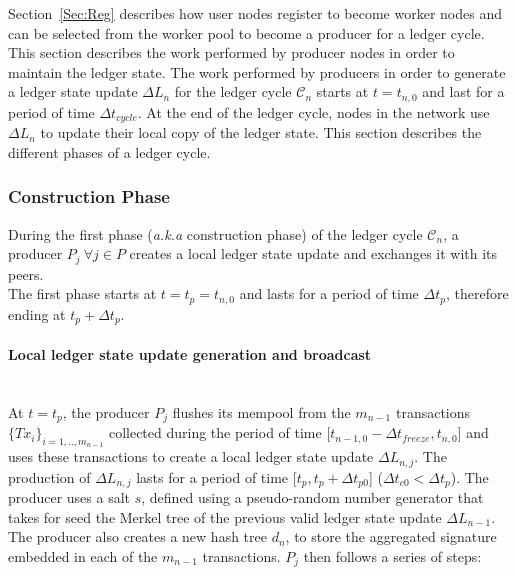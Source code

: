 Section~\ref{Sec:Reg} describes how user nodes register to become worker nodes and can be selected from the worker pool to become a producer for a ledger cycle. This section describes the work performed by producer nodes in order to maintain the ledger state. The work performed by producers in order to generate a ledger state update $\Delta L_n$ for the ledger cycle $\mathcal{C}_n$ starts at $t=t_{n,0}$ and last for a period of time $\Delta t_{cycle}$. At the end of the ledger cycle, nodes in the network use $\Delta L_n$ to update their local copy of the ledger state. This section describes the different phases of a ledger cycle. 


\subsubsection{Construction Phase}
\label{subsec:comp}

During the first phase (\textit{a.k.a} construction phase) of the ledger cycle $\mathcal{C}_n$, a producer $P_j~\forall j \in P$ creates a local ledger state update and exchanges it with its peers.\\

The first phase starts at $t = t_p = t_{n,0}$ and lasts for a period of time $\Delta t_{p}$, therefore ending at $t_p+\Delta t_{p}$.

\paragraph{Local ledger state update generation and broadcast}\mbox{}\\

At $t = t_p$, the producer $P_j$ flushes its mempool from the $m_{n-1}$ transactions $\{Tx_i\}_{i=1,..,m_{n-1}}$ collected during the period of time [$t_{n-1,0} - \Delta t_{freeze}, t_{n,0}$] and uses these transactions to create a local ledger state update $\Delta L_{n,j}$. The production of $\Delta L_{n,j}$ lasts for a period of time [$t_p, t_p+ \Delta t_{p0}$] ($\Delta t_{c0} < \Delta t_{p}$). The producer uses a salt $s$, defined using a pseudo-random number generator that takes for seed the Merkel tree of the previous valid ledger state update $\Delta L_{n-1}$. The producer also creates a new hash tree $d_n$, to store the aggregated signature embedded in each of the $m_{n-1}$ transactions. $P_j$ then follows a series of steps: 

